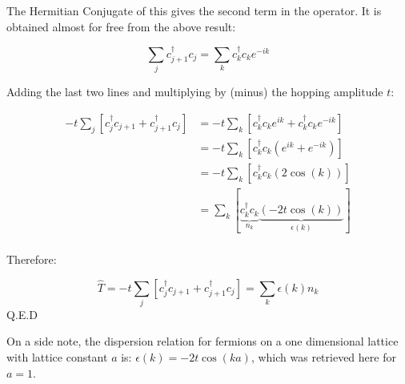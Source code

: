 The Hermitian Conjugate of this gives the second term in the operator. It is obtained almost for free from the above result:

\[ \sum_{j} c_{j+1}^{\dagger} c_{j} = \sum_{k} c_{k}^{\dagger} c_{k} e^{-ik} \]

Adding the last two lines and multiplying by (minus) the hopping amplitude $t$:

\[ \begin {aligned}
-t \sum_{j} [ c_{j}^{\dagger} c_{j+1} + c_{j+1}^{\dagger} c_{j} ] &= -t \sum_{k} [c_{k}^{\dagger} c_{k} e^{ik} + c_{k}^{\dagger} c_{k} e^{-ik}] \\
&= -t \sum_{k} [c_{k}^{\dagger} c_{k} (e^{ik} + e^{-ik})] \\
&= -t \sum_{k} [c_{k}^{\dagger} c_{k} (2\cos(k))] \\
&= \sum_{k} [\underbrace{c_{k}^{\dagger} c_{k}}_{n_{k}} \underbrace{(-2t\cos(k))}_{\epsilon(k)}] \\
\end {aligned} \]

Therefore:

\[ \hat{T} = -t \sum_{j} [ c_{j}^{\dagger} c_{j+1} + c_{j+1}^{\dagger} c_{j} ]  = \sum_{k} \epsilon(k) n_{k} \] Q.E.D

On a side note, the dispersion relation for fermions on a one dimensional lattice with lattice constant $a$ is: $\epsilon(k) = -2t\cos(ka)$, which was retrieved here for $a=1$.
